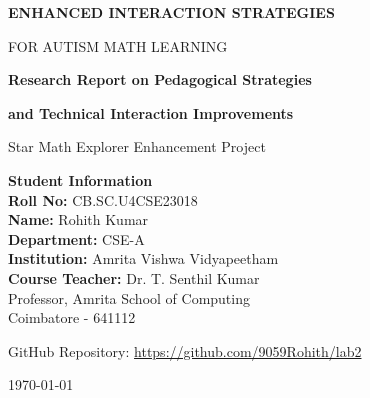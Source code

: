 \documentclass[12pt, a4paper]{article}
\begin{document}
\begin{titlepage}
    \centering
    \vspace*{2cm}
    
    {\Huge\bfseries\color{primaryblue} ENHANCED INTERACTION STRATEGIES\par}
    \vspace{0.5cm}
    {\LARGE\color{secondaryblue} FOR AUTISM MATH LEARNING\par}
    
    \vspace{1cm}
    
    \begin{tcolorbox}[colback=accentgreen!5, colframe=primaryblue, width=0.85\textwidth, arc=5mm]
        \centering
        {\Large\textbf{Research Report on Pedagogical Strategies}\par}
        \vspace{0.3cm}
        {\Large\textbf{and Technical Interaction Improvements}\par}
        \vspace{0.5cm}
        {\large Star Math Explorer Enhancement Project\par}
    \end{tcolorbox}
    
    \vspace{2cm}
    
    \begin{tcolorbox}[colback=secondaryblue!10, colframe=accentgreen, width=0.75\textwidth, arc=3mm]
        \centering
        \textbf{Student Information}\\
        \vspace{0.3cm}
        \textbf{Roll No:} CB.SC.U4CSE23018\\
        \textbf{Name:} Rohith Kumar\\
        \textbf{Department:} CSE-A\\
        \textbf{Institution:} Amrita Vishwa Vidyapeetham\\
        \vspace{0.3cm}
        \textbf{Course Teacher:} Dr. T. Senthil Kumar\\
        Professor, Amrita School of Computing\\
        Coimbatore - 641112
    \end{tcolorbox}
    
    \vspace{2cm}
    
    {\large GitHub Repository: \url{https://github.com/9059Rohith/lab2}\par}
    
    \vfill
    
    {\large \today\par}
\end{titlepage}
\end{document}
